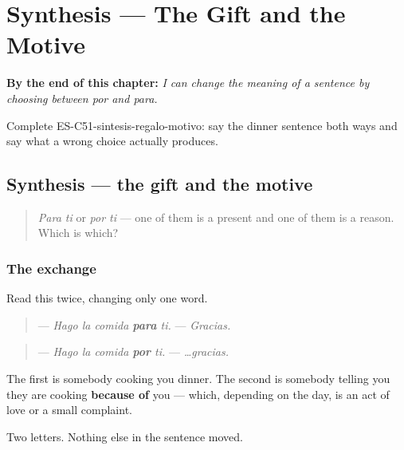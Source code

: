 
\chapter{Synthesis --- The Gift and the Motive}
\label{ch:synthesis-por-para}

\begin{chapteropening}
\textbf{By the end of this chapter:} \emph{I can change the meaning of a sentence by choosing between por and para.}

Complete ES-C51-sintesis-regalo-motivo: say the dinner sentence both ways and say what a wrong choice actually produces.
\end{chapteropening}

\section[Practice]{Synthesis — the gift and the motive}

\label{lesson:ES-C51-sintesis-regalo-motivo}



\begin{quote}
\emph{Para ti} or \emph{por ti} — one of them is a present and one of them is a reason. Which is which?
\end{quote}

\subsection*{The exchange}
Read this twice, changing only one word.

\begin{quote}
— \emph{Hago la comida \textbf{para} ti.} — \emph{Gracias.}
\end{quote}

\begin{quote}
— \emph{Hago la comida \textbf{por} ti.} — \emph{…gracias.}
\end{quote}

The first is somebody cooking you dinner. The second is somebody telling you they are cooking \textbf{because of} you — which, depending on the day, is an act of love or a small complaint.

Two letters. Nothing else in the sentence moved.

